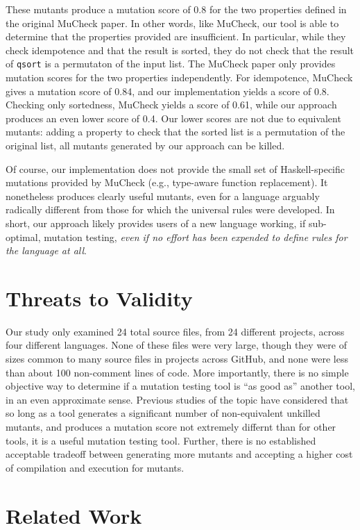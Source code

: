 \documentclass[sigconf,review, anonymous]{acmart}
\begin{document}
{These mutants produce a mutation
score of 0.8 for the two properties defined in the original MuCheck
paper.  In other words, like MuCheck, our tool is able to
determine that the properties provided are insufficient.  In
particular, while they check idempotence and that the result is
sorted, they do not check that the result of {\tt qsort} is a permutaton of the input
list.  The MuCheck paper only provides mutation scores for the two
properties independently.  For idempotence, MuCheck gives a mutation
score of 0.84, and our implementation yields a score of 0.8.  Checking
only sortedness, MuCheck yields a score of 0.61, while our approach
produces an even lower score of 0.4.  Our lower
scores are not due to equivalent mutants: adding a property to check
that the sorted list is a permutation of the original list, all
mutants generated by our approach can be killed.

Of course, our implementation does not provide the small set of Haskell-specific
mutations provided by MuCheck (e.g., type-aware function replacement).  It nonetheless produces clearly useful
mutants, even for a language arguably radically different from those
for which the universal rules were developed.  In short, our approach
likely provides users of a new language working, if sub-optimal, mutation testing,
\emph{even if no effort has been expended to define rules for the
  language at all}.

\section{Threats to Validity}

Our study only examined 24 total source files, from 24 different projects, across four different
languages.  None of these files were very large, though they were of
sizes common to many source files in projects across GitHub, and none
were less than about 100 non-comment lines of code.  More importantly,
there is no simple objective way to determine if a mutation testing
tool is ``as good as'' another tool, in an even approximate sense.
Previous studies of the topic have considered that so long as a tool
generates a significant number of non-equivalent unkilled mutants, and
produces a mutation score not extremely differnt than for other tools,
it is a useful mutation testing tool.  Further, there is no
established acceptable tradeoff between generating more mutants and
accepting a higher cost of compilation and execution for mutants.

\section{Related Work}

}
\end{document}
